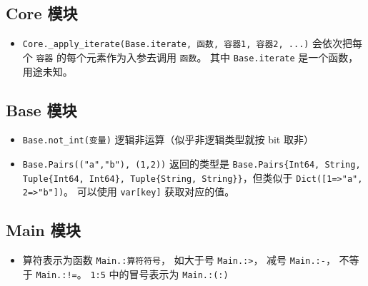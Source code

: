 \subsection{Core 模块}
\begin{itemize}
\item \verb`Core._apply_iterate(Base.iterate, 函数, 容器1, 容器2, ...)` 会依次把每个 \verb`容器` 的每个元素作为入参去调用 \verb`函数`。 其中 \verb`Base.iterate` 是一个函数，用途未知。
\end{itemize}

\subsection{Base 模块}
\begin{itemize}
\item \verb`Base.not_int(变量)` 逻辑非运算（似乎非逻辑类型就按 bit 取非）
\item \verb`Base.Pairs(("a","b"), (1,2))` 返回的类型是 \verb`Base.Pairs{Int64, String, Tuple{Int64, Int64}, Tuple{String, String}}`，但类似于 \verb`Dict([1=>"a", 2=>"b"])`。 可以使用 \verb`var[key]` 获取对应的值。
\end{itemize}

\subsection{Main 模块}
\begin{itemize}
\item 算符表示为函数 \verb`Main.:算符符号`， 如大于号 \verb`Main.:>`， 减号 \verb`Main.:-`， 不等于 \verb`Main.:!=`。 \verb`1:5` 中的冒号表示为 \verb`Main.:(:)`
\end{itemize}
